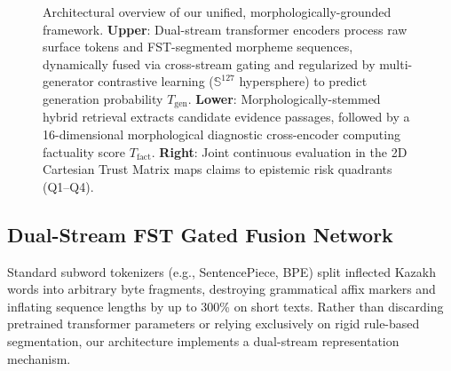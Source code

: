 \begin{figure}[t]
{
}
\caption{Architectural overview of our unified, morphologically-grounded framework. \textbf{Upper}: Dual-stream transformer encoders process raw surface tokens and FST-segmented morpheme sequences, dynamically fused via cross-stream gating and regularized by multi-generator contrastive learning ($\mathbb{S}^{127}$ hypersphere) to predict generation probability $T_{\text{gen}}$. \textbf{Lower}: Morphologically-stemmed hybrid retrieval extracts candidate evidence passages, followed by a 16-dimensional morphological diagnostic cross-encoder computing factuality score $T_{\text{fact}}$. \textbf{Right}: Joint continuous evaluation in the 2D Cartesian Trust Matrix maps claims to epistemic risk quadrants (Q1--Q4).}
\label{fig:framework_overview}
\end{figure}

\subsection{Dual-Stream FST Gated Fusion Network}
\label{sec:dual_stream_fusion}
Standard subword tokenizers (e.g., SentencePiece, BPE) split inflected Kazakh words into arbitrary byte fragments, destroying grammatical affix markers and inflating sequence lengths by up to 300\% on short texts. Rather than discarding pretrained transformer parameters or relying exclusively on rigid rule-based segmentation, our architecture implements a dual-stream representation mechanism.

